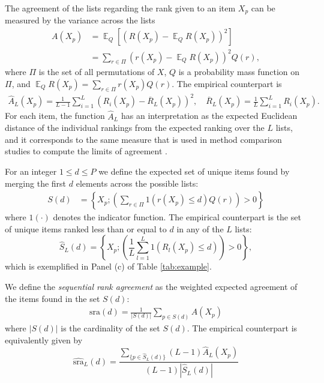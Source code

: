 \documentclass[12pt,a4paper]{article}
\newcommand{\nn}{\nonumber}
\DeclareMathOperator{\E}{\mathbb{E}}
\theoremstyle{plain}
\begin{document}
The agreement of the lists regarding the rank given to an item $X_p$
can be measured by the variance across the lists
\begin{align}
  A(X_p) &= \E_Q\left[\left(R(X_p)-\E_Q R(X_p)\right)^2\right]\\
   &= \sum_{r\in\Pi} \left(r(X_p)-\E_Q R(X_p)\right)^2 Q(r),\nn
\end{align}
where $\Pi$ is the set of all permutations of $X$, $Q$ is a
probability mass function on $\Pi$, and
$\E_Q R(X_p)=\sum_{r\in\Pi} r(X_p)Q(r)$. The empirical counterpart is
\begin{align}
\widehat{A}_L(X_p) = \frac{1}{L-1}\sum_{i=1}^L (R_i(X_p) - \overline{R}_L(X_p))^2, \quad \overline{R}_L(X_p) = \frac{1}{L}\sum_{i=1}^L R_i(X_p).\label{eq:empDistance}
\end{align}
For each item, the function $\widehat{A}_L$ has an interpretation as the expected
Euclidean distance of the individual rankings from the expected
ranking over the $L$ lists, and it corresponds to the same measure
that is used in method comparison studies to compute the limits of
agreement \citep{alt:bland:1983}.

For an integer $1\le d\le P$ we define the expected set of unique
items found by merging the first $d$ elements across the possible
lists:
\begin{align}
S(d) &= \left\{X_p; \left(\sum_{r\in\Pi} 1\left(r(X_p)\le d\right) Q(r)\right) >0\right\}\label{eq:sumset}
\end{align}
where $1(\cdot)$ denotes the indicator function.
The empirical counterpart is the set of unique items ranked less than or
equal to $d$ in any of the $L$ lists:
\begin{equation}
\widehat{S}_{L}(d) = \left\{X_p; \left(\frac{1}{L}\sum_{l=1}^L 1\left(R_l(X_p)\le d\right)\right)>0\right\},
\end{equation}
which is exemplified in Panel (c) of Table \ref{tab:example}.

We define the \emph{sequential rank agreement} as the weighted
expected agreement of the items found in the set $S(d)$:
\begin{align}
  \textrm{sra}(d) = \frac{1}{|S(d)|}\sum_{p \in S(d)}A(X_p)\label{def:sra}
\end{align}
where $|S(d)|$ is the cardinality of the set $S(d)$.
The empirical counterpart is equivalently given by
\begin{equation}
  \widehat{\textrm{sra}}_L(d) = \frac{\sum_{\{p \in \widehat{S}_{L}(d)\}}(L-1)\widehat{A}_L(X_p)}{(L-1)|\widehat {S}_{L}(d)|}\label{def:sraEst}
\end{equation}
\end{document}
